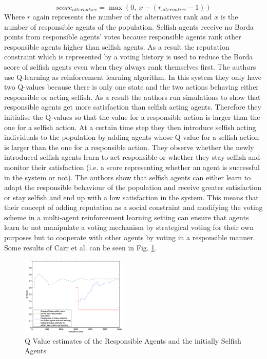 \documentclass[conference]{IEEEtran}
\begin{document}
\begin{equation}\label{eq:ModifiedBordaCount}
    score_{alternative}=\max(0,\ x-(r_{alternative}-1))
\end{equation}
Where $r$ again represents the number of the alternatives rank and $x$ is the number of responsible agents of the population. Selfish agents receive no Borda points from responsible agents' votes because responsible agents rank other responsible agents higher than selfish agents. As a result the reputation constraint which is represented by a voting history is used to reduce the Borda score of selfish agents even when they always rank themselves first.
\newline
The authors use Q-learning as reinforcement learning algorithm. In this system they only have two Q-values because there is only one state and the two actions behaving either responsible or acting selfish.
As a result the authors run simulations to show that responsible agents get more satisfaction than selfish acting agents. Therefore they initialise the Q-values so that the value for a responsible action is larger than the one for a selfish action. At a certain time step they then introduce selfish acting individuals to the population by adding agents whose Q-value for a selfish action is larger than the one for a responsible action. They observe whether the newly introduced selfish agents learn to act responsible or whether they stay selfish and monitor their satisfaction (i.e. a score representing whether an agent is successful in the system or not).
\newline
The authors show that selfish agents can either learn to adapt the responsible behaviour of the population and receive greater satisfaction or stay selfish and end up with a low satisfaction in the system. This means that their concept of adding reputation as a social constraint and modifying the voting scheme in a multi-agent reinforcement learning setting can ensure that agents learn to not manipulate a voting mechanism by strategical voting for their own purposes but to cooperate with other agents by voting in a responsible manner. Some results of Carr et al. \cite{carr2008peer} can be seen in Fig. \ref{SelfishVSResponsibleAgents}.

\begin{figure}[bt]
    \centering
    \includegraphics[width=0.45\textwidth]{Qvalues.png}
    \caption{Q Value estimates of the Responsible Agents and the initially Selfish Agents}
    \label{SelfishVSResponsibleAgents}
\end{figure}
\end{document}
